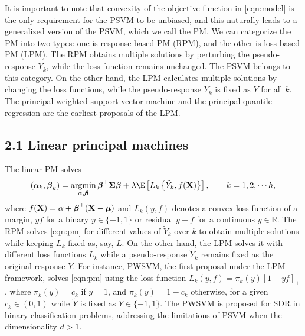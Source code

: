 It is important to note that convexity of the objective function in \eqref{eqn:model} is the only requirement for the PSVM to be unbiased, and this naturally leads to a generalized version of the PSVM, which we call the PM. We can categorize the PM into two types: one is response-based PM (RPM), and the other is loss-based PM (LPM). The RPM obtains multiple solutions by perturbing the pseudo-response $\tilde Y_k$, while the loss function remains unchanged. The PSVM belongs to this category. On the other hand, the LPM calculates multiple solutions by changing the loss functions, while the pseudo-response $Y_k$ is fixed as $Y$ for all $k$. The principal weighted support vector machine \citep[PWSVM,][]{shin2017principal} and the principal quantile regression \citep[PQR,][]{wang2018principal} are the earliest proposals of the LPM.  

\subsection{2.1 Linear principal machines} \label{sec:LPSDR}

The linear PM solves
\begin{align} \label{eqn:pm}
(\alpha_{k}, \bbeta_k) = \argmin_{\alpha, \bbeta} \bbeta^\top \bSigma\bbeta + \lambda \E \left[L_{k} \left\{\tilde Y_k, f(\bX)\right\} \right], \qquad k = 1, 2, \cdots h,
\end{align}
where $f(\mathbf{X}) = \alpha + \boldsymbol{\beta}^\top (\mathbf{X} - \boldsymbol{\mu})$ and $L_k(y, f)$ denotes a convex loss function of a margin, $yf$ for a binary $y \in \{-1, 1\}$ or residual $y - f$ for a continuous $y \in \mathbb{R}$. The RPM solves \eqref{eqn:pm} for different values of $\tilde Y_k$ over $k$ to obtain multiple solutions while keeping $L_k$ fixed as, say, $L$. On the other hand, the LPM  solves it with different loss functions $L_k$ while a pseudo-response $\tilde Y_k$ remains fixed as the original response $Y$. For instance, PWSVM, the first proposal under the LPM framework, solves \eqref{eqn:pm} using the loss function $L_k(y, f) = \pi_k(y)[1 - yf]_+$, where $\pi_k(y) = c_k$ if $y = 1$, and $\pi_k(y) = 1 - c_k$ otherwise, for a given $c_k \in (0,1)$ while $\tilde Y$ is fixed as $Y \in \{-1, 1\}$. The PWSVM is proposed for SDR in binary classification problems, addressing the limitations of PSVM when the dimensionality $d > 1$.

